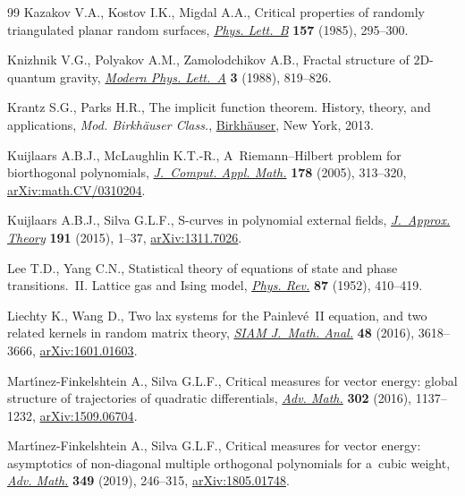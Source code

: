 \documentclass[10pt,a4paper]{amsart}
\numberwithin{equation}{section}
\begin{document}
\begin{thebibliography}{99}
Kazakov V.A., Kostov I.K., Migdal A.A., Critical properties of randomly
 triangulated planar random surfaces,
 \href{https://doi.org/10.1016/0370-2693(85)90669-0}{\textit{Phys. Lett.~B}}
 \textbf{157} (1985), 295--300.

Knizhnik V.G., Polyakov A.M., Zamolodchikov A.B., Fractal structure of
 {$2$}{D}-quantum gravity,
 \href{https://doi.org/10.1142/S0217732388000982}{\textit{Modern Phys.
 Lett.~A}} \textbf{3} (1988), 819--826.

Krantz S.G., Parks H.R., The implicit function theorem. History, theory, and
 applications, \textit{Mod. Birkh\"auser Class.},
 \href{https://doi.org/10.1007/978-1-4614-5981-1}{Birkh\"auser}, New York,
 2013.

Kuijlaars A.B.J., McLaughlin K.T.-R., A~{R}iemann--{H}ilbert problem for
 biorthogonal polynomials,
 \href{https://doi.org/10.1016/j.cam.2004.01.043}{\textit{J.~Comput. Appl.
 Math.}} \textbf{178} (2005), 313--320,
 \href{http://arxiv.org/abs/math.CV/0310204}{arXiv:math.CV/0310204}.

Kuijlaars A.B.J., Silva G.L.F., S-curves in polynomial external fields,
 \href{https://doi.org/10.1016/j.jat.2014.04.002}{\textit{J.~Approx. Theory}}
 \textbf{191} (2015), 1--37,
 \href{http://arxiv.org/abs/1311.7026}{arXiv:1311.7026}.

Lee T.D., Yang C.N., Statistical theory of equations of state and phase
 transitions.~{II}. {L}attice gas and {I}sing model,
 \href{https://doi.org/10.1103/PhysRev.87.410}{\textit{Phys. Rev.}}
 \textbf{87} (1952), 410--419.

Liechty K., Wang D., Two lax systems for the {P}ainlev\'e~{II} equation, and
 two related kernels in random matrix theory,
 \href{https://doi.org/10.1137/16M1056080}{\textit{SIAM J.~Math. Anal.}}
 \textbf{48} (2016), 3618--3666,
 \href{http://arxiv.org/abs/1601.01603}{arXiv:1601.01603}.

Mart\'{\i}nez-Finkelshtein A., Silva G.L.F., Critical measures for vector
 energy: global structure of trajectories of quadratic differentials,
 \href{https://doi.org/10.1016/j.aim.2016.08.009}{\textit{Adv. Math.}}
 \textbf{302} (2016), 1137--1232,
 \href{http://arxiv.org/abs/1509.06704}{arXiv:1509.06704}.

Mart\'{\i}nez-Finkelshtein A., Silva G.L.F., Critical measures for vector
 energy: asymptotics of non-diagonal multiple orthogonal polynomials for
 a~cubic weight, \href{https://doi.org/10.1016/j.aim.2019.04.010}{\textit{Adv.
 Math.}} \textbf{349} (2019), 246--315,
 \href{http://arxiv.org/abs/1805.01748}{arXiv:1805.01748}.


\end{thebibliography}
\end{document}
